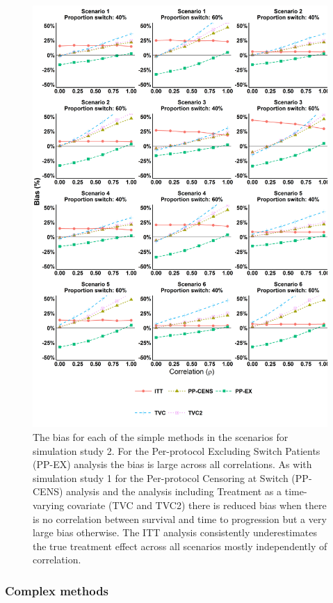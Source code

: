 \begin{figure}[ht]
\centering
\includegraphics[width=13cm]{images/chap_sim3/simple_bias.png}
\caption{\label{F:chap_sim3:simple_bias} The bias for each of the simple methods in the scenarios for simulation study 2. For the Per-protocol Excluding Switch Patients (PP-EX) analysis the bias is large across all correlations. As with simulation study 1 for the Per-protocol Censoring at Switch (PP-CENS) analysis and the analysis including Treatment as a time-varying covariate (TVC and TVC2) there is reduced bias when there is no correlation between survival and time to progression but a very large bias otherwise. The ITT analysis consistently underestimates the true treatment effect across all scenarios mostly independently of correlation.} 
\end{figure}

\clearpage

\subsubsection{Complex methods}

